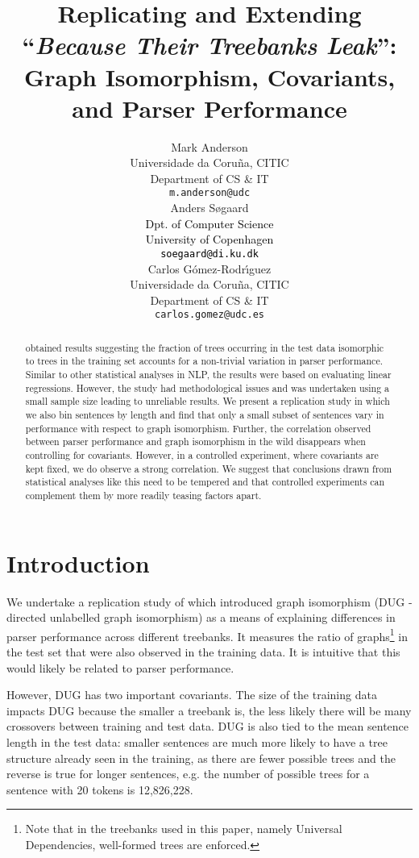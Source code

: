 \documentclass[11pt,a4paper]{article}
\title{Replicating and Extending ``\textit{Because Their Treebanks Leak}'':\\%
Graph Isomorphism, Covariants, and Parser Performance}
\author{Mark Anderson \\
 Universidade da Coru\~na, CITIC\\
 Department of CS \& IT \\
  {\tt m.anderson@udc} \\\And
  Anders S{\o}gaard\\
  \textcolor{black}{Dpt. of Computer Science}\\
  \textcolor{black}{University of Copenhagen}\\
  {\tt \textcolor{black}{soegaard@di.ku.dk}} \\\And
  Carlos G{\'o}mez-Rodr{\'\i}guez \\
 Universidade da Coru\~na, CITIC\\
 Department of CS \& IT \\
  {\tt carlos.gomez@udc.es} \\}
\date{}
\begin{document}
\maketitle
\begin{abstract}
\citet{sogaard-2020-languages} obtained results suggesting the fraction of trees occurring in the test data isomorphic to trees in the training set accounts for a non-trivial variation in parser performance. Similar to other statistical analyses in NLP, the results were based on evaluating linear regressions. However, the study had methodological issues and was undertaken using a small sample size leading to unreliable results. We present a replication study in which we also bin sentences by length and find that only a small subset of sentences vary in performance with respect to graph isomorphism. Further, 
the correlation observed between parser performance and graph isomorphism in the wild disappears 
when controlling for covariants. However, in a controlled experiment, where covariants are kept fixed, we do observe a strong correlation. We suggest that conclusions drawn from statistical analyses like this need to be tempered and that controlled experiments can complement them by more readily teasing factors apart.
\end{abstract}

\section{Introduction}
We undertake a replication study of \citet{sogaard-2020-languages} which introduced graph isomorphism (DUG - directed unlabelled graph isomorphism) as a means of explaining differences in parser performance across different treebanks. It measures the ratio of graphs\footnote{Note that in the treebanks used in this paper, namely Universal Dependencies, well-formed trees are enforced.}
in the test set that were also observed in the training data. It is intuitive that this would likely be related to parser performance. 

However, DUG has two important covariants. The size of the training data impacts DUG because the smaller a treebank is, the less likely there will be many crossovers between training and test data. DUG is also tied to the mean sentence length in the test data: smaller sentences are much more likely to have a tree structure already seen in the training, as there are fewer possible trees and the reverse is true for longer sentences, e.g. the number of possible trees for a sentence with 20 tokens is 12,826,228.
\end{document}
